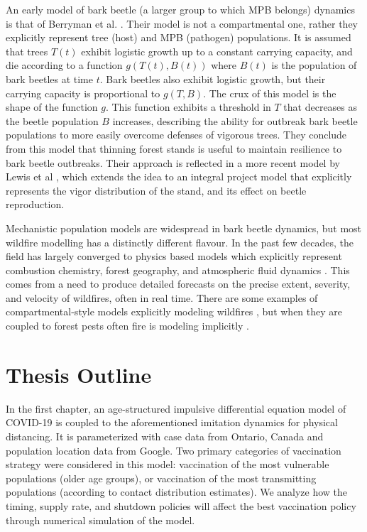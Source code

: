 An early model of bark beetle (a larger group to which MPB belongs) dynamics is that of Berryman et al. \cite{berryman1984metastability}. Their model is not a compartmental one, rather they explicitly represent tree (host) and MPB (pathogen) populations. It is assumed that trees $T(t)$ exhibit logistic growth up to a constant carrying capacity, and die according to a function $g(T(t),B(t))$ where $B(t)$ is the population of bark beetles at time $t$. Bark beetles also exhibit logistic growth, but their carrying capacity is proportional to $g(T,B)$. The crux of this model is the shape of the function $g$. This function exhibits a threshold in $T$ that decreases as the beetle population $B$ increases, describing the ability for outbreak bark beetle populations to more easily overcome defenses of vigorous trees. They conclude from this model that thinning forest stands is useful to maintain resilience to bark beetle outbreaks. Their approach is reflected in a more recent model by Lewis et al \cite{lewis2010structured}, which extends the idea to an integral project model that explicitly represents the vigor distribution of the stand, and its effect on beetle reproduction. 

Mechanistic population models are widespread in bark beetle dynamics, but most wildfire modelling has a distinctly different flavour. In the past few decades, the field has largely converged to physics based models which explicitly represent combustion chemistry, forest geography, and atmospheric fluid dynamics \cite{linn2002studying,mell2007physics,bakhshaii2019review}. This comes from a need to produce detailed forecasts on the precise extent, severity, and velocity of wildfires, often in real time. There are some examples of compartmental-style models explicitly modeling wildfires \cite{casagrandi1999minimal}, but when they are coupled to forest pests often fire is modeling implicitly \cite{chen2014model}.

\section{Thesis Outline}

In the first chapter, an age-structured impulsive differential equation model of COVID-19 is coupled to the aforementioned imitation dynamics for physical distancing. It is parameterized with case data from Ontario, Canada and population location data from Google. Two primary categories of vaccination strategy were considered in this model: vaccination of the most vulnerable populations (older age groups), or vaccination of the most transmitting populations (according to contact distribution estimates). We analyze how the timing, supply rate, and shutdown policies will affect the best vaccination policy through numerical simulation of the model.

